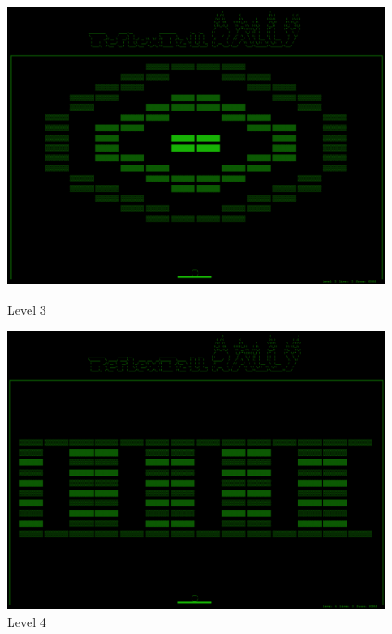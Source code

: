 \begin{figure}[ht]
\begin{minipage}[b]{0.5\linewidth}
\centering
\includegraphics[scale=0.12]{figs/screenshots/level3.png}
\caption{Level 3}
\label{fig:level3}
\end{minipage}
\hspace{0.5cm}
\begin{minipage}[b]{0.5\linewidth}
\centering
\includegraphics[scale=0.12]{figs/screenshots/level4.png}
\caption{Level 4}
\label{fig:level4}
\end{minipage}
\end{figure}

